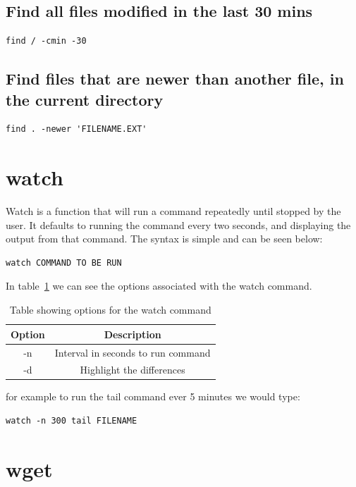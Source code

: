\subsection{Find all files modified in the last 30 mins}
\begin{lstlisting}
find / -cmin -30
\end{lstlisting}

\subsection{Find files that are newer than another file, in the current directory}
\begin{lstlisting}
find . -newer 'FILENAME.EXT'
\end{lstlisting}

\section{watch}
\label{sec:watch}

Watch is a function that will run a command repeatedly until stopped by the user.  It defaults to running the command every two seconds, and displaying the output from that command. The syntax is simple and can be seen below:

\begin{lstlisting}
watch COMMAND TO BE RUN
\end{lstlisting}

In table~\ref{tab:watch} we can see the options associated with the watch command.

\begin{table}[!th]
\centering
\begin{tabular}{cc}
\hline
Option & Description\\
\hline
-n & Interval in seconds to run command\\
-d & Highlight the differences\\
\hline
\end{tabular}
\caption{Table showing options for the watch command}
\label{tab:watch}
\end{table}



for example to run the tail command ever 5 minutes we would type:

\begin{lstlisting}
watch -n 300 tail FILENAME
\end{lstlisting}

\section{wget}

